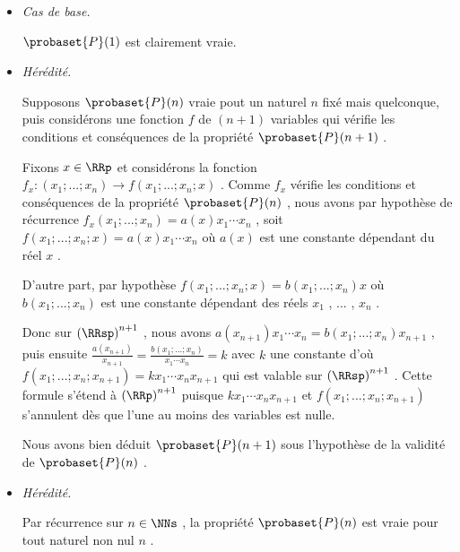 \begin{itemize}[label=\small\textbullet]
	\item \emph{Cas de base.}
	
	\noindent
	$\probaset{P}(1)$ est clairement vraie.


	\medskip
	\item \emph{Hérédité.}
	
	\noindent
	Supposons $\probaset{P}(n)$ vraie pout un naturel $n$ fixé mais quelconque, puis considérons une fonction $f$ de $(n + 1)$ variables qui vérifie les conditions et conséquences de la propriété $\probaset{P}(n + 1)$ .
	
	\smallskip
	\noindent
	Fixons $x \in \RRp$ et considérons la fonction $f_x : (x_1 ; ... ; x_n) \rightarrow f(x_1 ; ... ; x_n ; x)$ .
	Comme $f_x$  vérifie les conditions et conséquences de la propriété $\probaset{P}(n)$ ,
	nous avons par hypothèse de récurrence 
	$f_x(x_1 ; ... ; x_n) = a(x) x_1 \cdots x_n$ , soit $f(x_1 ; ... ; x_n ; x) = a(x) x_1 \cdots x_n$ où $a(x)$ est une constante dépendant du réel $x$ .
	
	\smallskip
	\noindent
	D'autre part, par hypothèse $f(x_1 ; ... ; x_n ; x) = b(x_1 ; ... ; x_n) x$ où $b(x_1 ; ... ; x_n)$ est une constante dépendant des réels $x_1$ , ... , $x_n$ .
	
	\smallskip
	\noindent
	Donc sur $\left( \RRsp \right)^{n+1}$ , nous avons
	$a(x_{n+1}) x_1 \cdots x_n = b(x_1 ; ... ; x_n) x_{n+1}$ ,
	puis ensuite
	$\frac{a(x_{n+1})}{x_{n+1}} = \frac{b(x_1 ; ... ; x_n)}{x_1 \cdots x_n} = k$
	avec $k$ une constante d'où
	$f(x_1 ; ... ; x_n ; x_{n+1}) = k x_1 \cdots x_n x_{n+1}$
	qui est valable sur $\left( \RRsp \right)^{n+1}$ .
	Cette formule s'étend à $\left( \RRp \right)^{n+1}$ puisque
	$k x_1 \cdots x_n x_{n+1}$ et $f(x_1 ; ... ; x_n ; x_{n+1})$ s'annulent dès que l'une au moins des variables est nulle.
	
	\smallskip
	\noindent
	Nous avons bien déduit $\probaset{P}(n+1)$ sous l'hypothèse de la validité de $\probaset{P}(n)$ .


	\medskip
	\item \emph{Hérédité.}
	
	\smallskip
	\noindent
	Par récurrence sur $n \in \NNs$ , la propriété $\probaset{P}(n)$ est vraie pour tout naturel non nul $n$ .
\end{itemize} 

